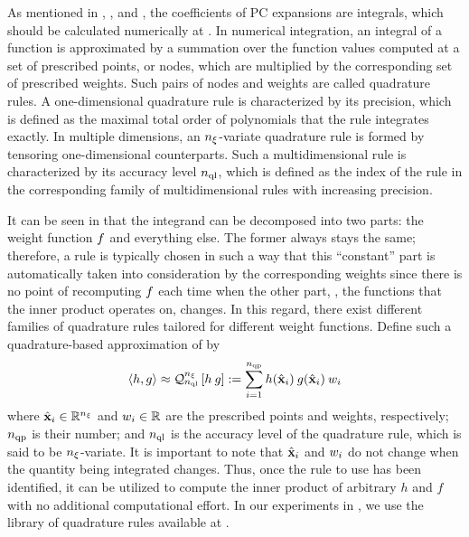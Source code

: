 As mentioned in , , and , the coefficients of PC expansions are integrals, which should be calculated numerically at .
In numerical integration, an integral of a function is approximated by a summation over the function values computed at a set of prescribed points, or nodes, which are multiplied by the corresponding set of prescribed weights.
Such pairs of nodes and weights are called quadrature rules.
A one-dimensional quadrature rule is characterized by its precision, which is defined as the maximal total order \cite{heiss2008} of polynomials that the rule integrates exactly.
In multiple dimensions, an ${n_\xi}$-variate quadrature rule is formed by tensoring one-dimensional counterparts. Such a multidimensional rule is characterized by its accuracy level ${n_\text{ql}}$, which is defined as the index of the rule in the corresponding family of multidimensional rules with increasing precision.

It can be seen in  that the integrand can be decomposed into two parts: the weight function $f$ and everything else.
The former always stays the same; therefore, a rule is typically chosen in such a way that this ``constant'' part is automatically taken into consideration by the corresponding weights since there is no point of recomputing $f$ each time when the other part, \ie, the functions that the inner product operates on, changes.
In this regard, there exist different families of quadrature rules tailored for different weight functions.
Define such a quadrature-based approximation of  by
\begin{equation} \elabel{quadrature}
  \oInner{h}{g} \approx \oQuad{\nvars}{\qdlevel}{h \: g} := \sum_{i = 1}^{\qdorder} h(\qdn{\vX}_i) \: g(\qdn{\vX}_i) \: \qdw_i
\end{equation}
where $\hat{\mathbf{x}}_i \in \mathbb{R}^{n_\xi}$ and $w_i \in \mathbb{R}$ are the prescribed points and weights, respectively; ${n_\text{qp}}$ is their number; and ${n_\text{ql}}$ is the accuracy level of the quadrature rule, which is said to be ${n_\xi}$-variate.
It is important to note that $\hat{\mathbf{x}}_i$ and $w_i$ do not change when the quantity being integrated changes.
Thus, once the rule to use has been identified, it can be utilized to compute the inner product of arbitrary $h$ and $f$ with no additional computational effort.
In our experiments in , we use the library of quadrature rules available at \cite{burkardt2013}.

